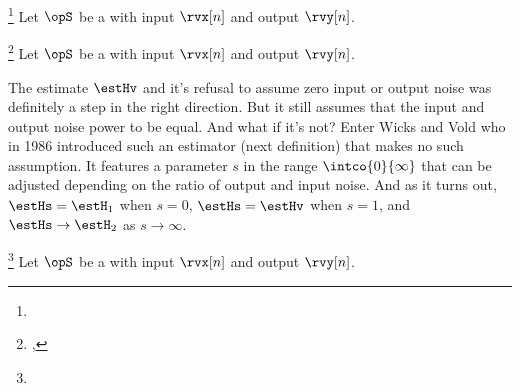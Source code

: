 \begin{definition}
\footnote{
  }
\label{def:Hharm}
Let $\opS$ be a  with input $\rvx[n]$ and output $\rvy[n]$.
\end{definition}

\begin{definition}
\footnote{
  ,
  }
\label{def:Hv}
Let $\opS$ be a  with input $\rvx[n]$ and output $\rvy[n]$.
\end{definition}

The estimate $\estHv$ and it's refusal to assume zero input or output noise 
was definitely a step in the right direction.
But it still assumes that the input and output noise power to be equal.
And what if it's not? 
Enter Wicks and Vold who in 1986 introduced such an estimator (next definition)
that makes no such assumption.
It features a parameter $s$ in the range $\intco{0}{\infty}$
that can be adjusted depending on the ratio of output and input noise.
And as it turns out, $\estHs = \estH_1$ when $s=0$, $\estHs=\estHv$ when $s=1$, and 
$\estHs\to\estH_2$ as $s\to\infty$. %
\begin{definition}
\footnote{
  }
\label{def:Hs}
Let $\opS$ be a  with input $\rvx[n]$ and output $\rvy[n]$.
\end{definition}

